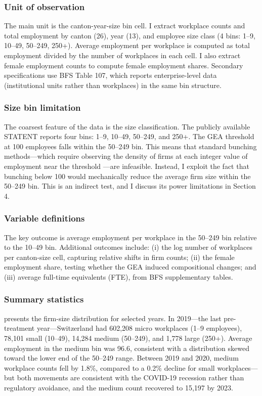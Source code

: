 \documentclass[12pt]{article}
\begin{document}
\subsubsection*{Unit of observation} The main unit is the canton-year-size bin cell. I extract workplace counts and total employment by canton (26), year (13), and employee size class (4 bins: 1--9, 10--49, 50--249, 250+). Average employment per workplace is computed as total employment divided by the number of workplaces in each cell. I also extract female employment counts to compute female employment shares. Secondary specifications use BFS Table 107, which reports enterprise-level data (institutional units rather than workplaces) in the same bin structure.

\subsubsection*{Size bin limitation} The coarsest feature of the data is the size classification. The publicly available STATENT reports four bins: 1--9, 10--49, 50--249, and 250+. The GEA threshold at 100 employees falls within the 50--249 bin. This means that standard bunching methods---which require observing the density of firms at each integer value of employment near the threshold \citep{kleven2016bunching}---are infeasible. Instead, I exploit the fact that bunching below 100 would mechanically reduce the average firm size within the 50--249 bin. This is an indirect test, and I discuss its power limitations in Section 4.

\subsubsection*{Variable definitions} The key outcome is average employment per workplace in the 50--249 bin relative to the 10--49 bin. Additional outcomes include: (i) the log number of workplaces per canton-size cell, capturing relative shifts in firm counts; (ii) the female employment share, testing whether the GEA induced compositional changes; and (iii) average full-time equivalents (FTE), from BFS supplementary tables.

\subsubsection*{Summary statistics}  presents the firm-size distribution for selected years. In 2019---the last pre-treatment year---Switzerland had 602,208 micro workplaces (1--9 employees), 78,101 small (10--49), 14,284 medium (50--249), and 1,778 large (250+). Average employment in the medium bin was 96.6, consistent with a distribution skewed toward the lower end of the 50--249 range. Between 2019 and 2020, medium workplace counts fell by 1.8\%, compared to a 0.2\% decline for small workplaces---but both movements are consistent with the COVID-19 recession rather than regulatory avoidance, and the medium count recovered to 15,197 by 2023.
\end{document}

